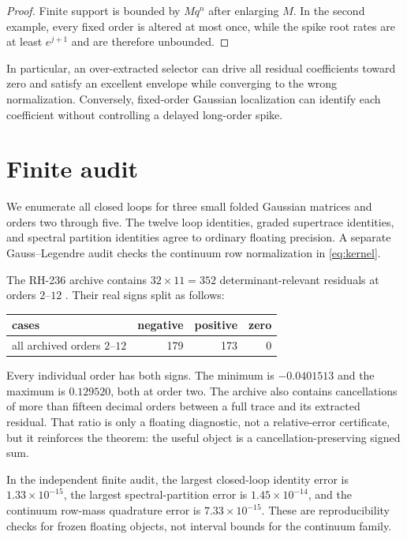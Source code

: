 \documentclass[11pt]{article}
\theoremstyle{remark}
\begin{document}
\begin{proof}
Finite support is bounded by $Mq^n$ after enlarging $M$.  In the second
example, every fixed order is altered at most once, while the spike root
rates are at least $e^{j+1}$ and are therefore unbounded.
\end{proof}

In particular, an over-extracted selector can drive all residual coefficients
toward zero and satisfy an excellent envelope while converging to the wrong
normalization.  Conversely, fixed-order Gaussian localization can identify
each coefficient without controlling a delayed long-order spike.

\section{Finite audit}

We enumerate all closed loops for three small folded Gaussian matrices and
orders two through five.  The twelve loop identities, graded supertrace
identities, and spectral partition identities agree to ordinary floating
precision.  A separate Gauss--Legendre audit checks the continuum row
normalization in \eqref{eq:kernel}.

The RH-236 archive contains $32\times11=352$ determinant-relevant residuals
at orders $2$--$12$ \citep{WangRH236}.  Their real signs split as follows:
\begin{center}
\begin{tabular}{lrrr}
\toprule
cases & negative & positive & zero\\
\midrule
all archived orders $2$--$12$ & 179 & 173 & 0\\
\bottomrule
\end{tabular}
\end{center}
Every individual order has both signs.  The minimum is
$-0.0401513$ and the maximum is $0.129520$, both at order two.  The archive
also contains cancellations of more than fifteen decimal orders between a
full trace and its extracted residual.  That ratio is only a floating
diagnostic, not a relative-error certificate, but it reinforces the theorem:
the useful object is a cancellation-preserving signed sum.

In the independent finite audit, the largest closed-loop identity error is
$1.33\times10^{-15}$, the largest spectral-partition error is
$1.45\times10^{-14}$, and the continuum row-mass quadrature error is
$7.33\times10^{-15}$.  These are reproducibility checks for frozen floating
objects, not interval bounds for the continuum family.
\end{document}
